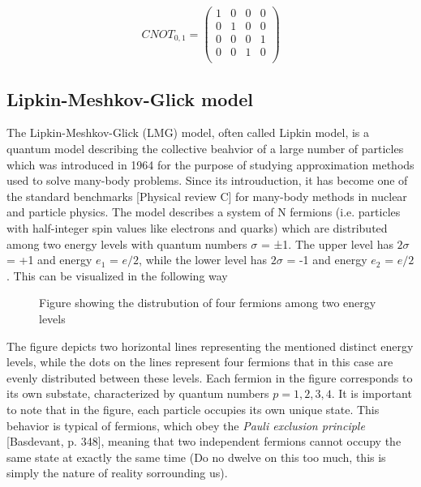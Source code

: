 \documentclass[onecolumn,10pt,cleanfoot]{asme2ej}
\begin{document}
\begin{enumerate}
		\begin{equation*}
		 CNOT_{0,1} = \begin{pmatrix}
			1 & 0 & 0 & 0 \\
			0 & 1 & 0 & 0 \\
			0 & 0 & 0 & 1 \\
			0 & 0 & 1 & 0 \\
		\end{pmatrix}
	\end{equation*}

\end{enumerate}



\subsection{Lipkin-Meshkov-Glick model}
The Lipkin-Meshkov-Glick (LMG) model, often called Lipkin model, is a quantum model describing the collective beahvior of a large number of particles which was introduced in 1964 for the purpose of studying approximation methods used to solve many-body problems. Since its introuduction, it has become one of the standard benchmarks [Physical review C] for many-body methods in nuclear and particle physics. The model describes a system of N fermions (i.e. particles with half-integer spin values like electrons and quarks) which are distributed among two energy levels with quantum numbers $\sigma$ = ±1. The upper level has $2\sigma$ = +1 and energy $e_{1}$ = $e/2$, while the lower level has $2\sigma$ = -1 and energy $e_{2}$ = $e/2$. This can be visualized in the following way

\begin{figure}[H]
	\centering
	\caption{Figure showing the distrubution of four fermions among two energy levels}
\end{figure}

The figure depicts two horizontal lines representing the mentioned distinct energy levels, while the dots on the lines represent four fermions that in this case are evenly distributed between these levels. Each fermion in the figure corresponds to its own substate, characterized by quantum numbers $p = 1, 2, 3, 4$. It is important to note that in the figure, each particle occupies its own unique state. This behavior is typical of fermions, which obey the \textit{Pauli exclusion principle} [Basdevant, p. 348], meaning that two independent fermions cannot occupy the same state at exactly the same time (Do no dwelve on this too much, this is simply the nature of reality sorrounding us).
\end{document}
